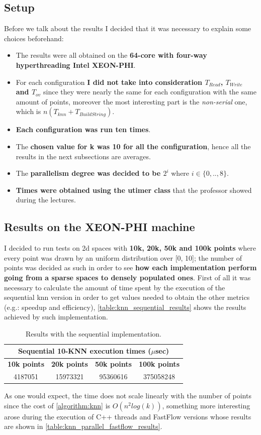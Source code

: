\subsection{Setup}
Before we talk about the results I decided that it was necessary to explain some choices beforehand:
\begin{itemize}
    \item The results were all obtained on the \textbf{64-core with four-way hyperthreading Intel XEON-PHI}.
    \item For each configuration \textbf{I did not take into consideration $T_{Read}$, $T_{Write}$ and $T_{ov}$} since they were nearly the same for each configuration with the same amount of points, moreover the most interesting part is the \textit{non-serial} one, which is $n(T_{knn}+T_{BuildString})$.
    \item \textbf{Each configuration was run ten times}.
    \item The\textbf{ chosen value for k was 10 for all the configuration}, hence all the results in the next subsections are averages.
    \item The \textbf{parallelism degree was decided to be $2^i$} where $i\in\{0, .., 8\}$.
    \item \textbf{Times were obtained using the utimer class} that the professor showed during the lectures.
\end{itemize}
\subsection{Results on the XEON-PHI machine}
I decided to run tests on 2d spaces with \textbf{10k, 20k, 50k and 100k points} where every point was drawn by an uniform distribution over [0, 10]; the number of points was decided as such in order to see \textbf{how each implementation perform going from a sparse spaces to densely populated ones}. First of all it was necessary to calculate the amount of time spent by the execution of the sequential knn version in order to get values needed to obtain the other metrics (e.g.: speedup and efficiency), \autoref{table:knn_sequential_results} shows the results achieved by such implementation.

\begin{table}[H]
\centering
\begin{tabular}{c|c|c|c}\hline \hline
\multicolumn{4}{c}{\textbf{Sequential 10-KNN execution times ($\mu$sec)}} \\\hline
\textbf{10k points} & \textbf{20k points} & \textbf{50k points} & \textbf{100k points}\\\hline
4187051 & 15973321 & 95360616 & 375058248 \\
\hline \hline
\end{tabular}
\caption{Results with the sequential implementation.}
\label{table:knn_sequential_results}
\end{table}
As one would expect, the time does not scale linearly with the number of points since the cost of \autoref{algorithm:knn} is $O(n^2log(k))$, something more interesting arose during the execution of C++ threads and FastFlow versions whose results are shown in \autoref{table:knn_parallel_fastflow_results}.

